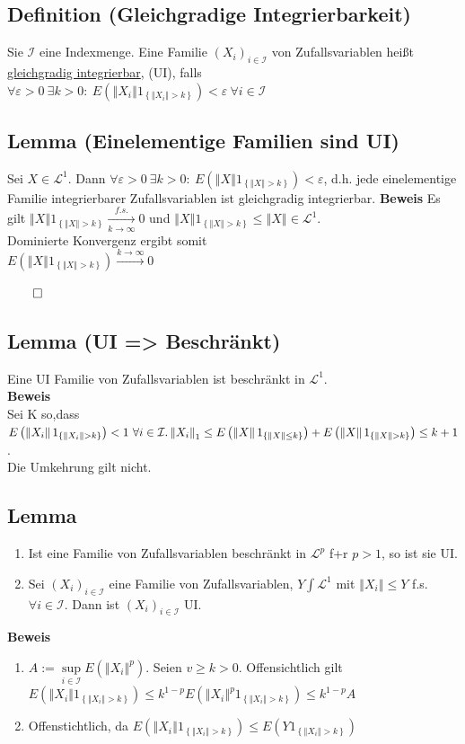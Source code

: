 \documentclass[german,10pt,oneside, fleqn, a4paper]{article}
\newcommand {\N}	{\mathbb{N}}
\newcommand{\brc}[1]{\left(#1\right)}
\newcommand{\brac}[1]{\left\lbrace #1\right\rbrace}
\newcommand{\folge}[3][\N]{\left(#2_#3\right)_{#3\in #1}}
\newcommand{\norm}[1]{\left\Vert #1 \right\Vert}
\newcommand{\QED}{\begin{flushright}$\qed$\end{flushright}}
\newcommand{\mc}[1]{\mathcal{#1}}
\newcommand{\lp}[1]{\mc{L}^{#1}}
\newcommand{\beweis}{\textbf{Beweis}\\}
\newcommand{\1}[1]{1_{#1}}
\newcommand{\2}[1]{\1{\brac{#1}}}
\begin{document}
\subsection{Definition (Gleichgradige Integrierbarkeit)}
Sie $\mc{I}$ eine Indexmenge. Eine Familie $\folge[\mc{I}]{X}{i}$ von Zufallsvariablen heißt \underline{gleichgradig integrierbar}, (UI), falls\\ $\forall\varepsilon>0\ \exists k>0:\ E\brc{\norm{X_i}1_{\brac{\norm{X_i}>k}}}<\varepsilon\ \forall i\in\mc{I}$

\subsection{Lemma (Einelementige Familien sind UI)}
Sei $X\in\mc{L}^1$. Dann $\forall\varepsilon>0\ \exists k>0:\ E\brc{\norm{X}1_{\brac{\norm{X}>k}}}<\varepsilon$, d.h. jede einelementige Familie integrierbarer Zufallsvariablen ist gleichgradig integrierbar.
\textbf{Beweis}
Es gilt $\norm{X}1_{\brac{\norm{X}>k}}\xrightarrow[k\rightarrow\infty]{f.s.}0$ und $\norm{X}1_{\brac{\norm{X}>k}}\leq \norm{X}\in\lp{1}$. \\
Dominierte Konvergenz ergibt somit \\
$E\brc{\norm{X}1_{\brac{\norm{X}>k}}}\xrightarrow{k\rightarrow\infty}0$\QED

\subsection{Lemma (UI => Beschränkt)}
\label{2.13}
Eine UI Familie von Zufallsvariablen ist beschränkt in $\lp{1}$.\\
\beweis
Sei K so,dass $E\brc{\norm{X_i}1_{\brac{\norm{X_i}>k}}}<1\ \forall i\in\mc{I}.\\
\norm{X_i}_1\leq E\brc{\norm{X}1_{\brac{\norm{X}\leq k}}}+E\brc{\norm{X}1_{\brac{\norm{X}>k}}}\leq k+1$.\\
Die Umkehrung gilt nicht.

\subsection{Lemma}
\begin{enumerate}[label=(\alph*)]
\item Ist eine Familie von Zufallsvariablen beschränkt in $\lp{p}$ f+r $p>1$, so ist sie UI.
\item Sei $\folge[\mc{I}]{X}{i}$ eine Familie von Zufallsvariablen, $Y\int\lp{1}$ mit $\norm{X_i}\leq Y$ f.s. $\forall i \in\mc{I}$. Dann ist $\folge[\mc{I}]{X}{i}$ UI.\\
\end{enumerate}
\beweis
\begin{enumerate}[label=(\alph*)]
\item $A:=\sup\limits_{i\in\mc{I}}E\brc{\norm{X_i}^p}.$ Seien  $v\geq k >0$. Offensichtlich gilt $E\brc{\norm{X_i}1_{\brac{\norm{X_i}>k}}}\leq k^{1-p}E\brc{\norm{X_i}^p1_{\brac{\norm{X_i}>k}}}\leq k^{1-p}A$
\item Offenstichtlich, da $E\brc{\norm{X_i}1_{\brac{\norm{X_i}>k}}}\leq E\brc{Y1_{\brac{\norm{X_i}>k}}}$
\end{enumerate}
\end{document}
